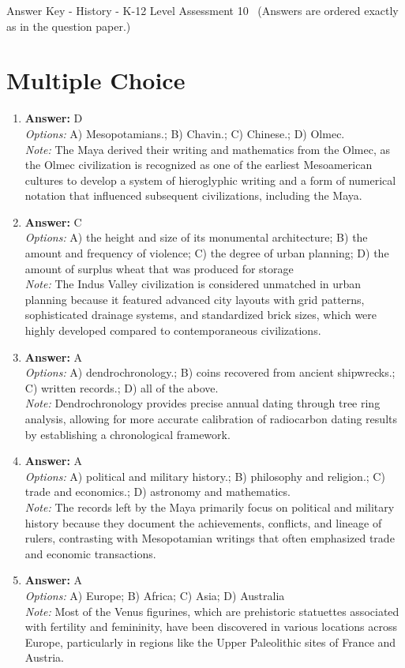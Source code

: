 \documentclass[12pt]{article}
\begin{document}
\begin{center}
Answer Key - History - K-12 Level Assessment 10 \
\small (Answers are ordered exactly as in the question paper.)
\end{center}

\section*{Multiple Choice}
\begin{enumerate}[label=\arabic*.]
\item \textbf{Answer:} D
\\ \textit{Options:} A) Mesopotamians.; B) Chavin.; C) Chinese.; D) Olmec.
\\ \textit{Note:} The Maya derived their writing and mathematics from the Olmec, as the Olmec civilization is recognized as one of the earliest Mesoamerican cultures to develop a system of hieroglyphic writing and a form of numerical notation that influenced subsequent civilizations, including the Maya.
\item \textbf{Answer:} C
\\ \textit{Options:} A) the height and size of its monumental architecture; B) the amount and frequency of violence; C) the degree of urban planning; D) the amount of surplus wheat that was produced for storage
\\ \textit{Note:} The Indus Valley civilization is considered unmatched in urban planning because it featured advanced city layouts with grid patterns, sophisticated drainage systems, and standardized brick sizes, which were highly developed compared to contemporaneous civilizations.
\item \textbf{Answer:} A
\\ \textit{Options:} A) dendrochronology.; B) coins recovered from ancient shipwrecks.; C) written records.; D) all of the above.
\\ \textit{Note:} Dendrochronology provides precise annual dating through tree ring analysis, allowing for more accurate calibration of radiocarbon dating results by establishing a chronological framework.
\item \textbf{Answer:} A
\\ \textit{Options:} A) political and military history.; B) philosophy and religion.; C) trade and economics.; D) astronomy and mathematics.
\\ \textit{Note:} The records left by the Maya primarily focus on political and military history because they document the achievements, conflicts, and lineage of rulers, contrasting with Mesopotamian writings that often emphasized trade and economic transactions.
\item \textbf{Answer:} A
\\ \textit{Options:} A) Europe; B) Africa; C) Asia; D) Australia
\\ \textit{Note:} Most of the Venus figurines, which are prehistoric statuettes associated with fertility and femininity, have been discovered in various locations across Europe, particularly in regions like the Upper Paleolithic sites of France and Austria.
\end{enumerate}
\end{document}
